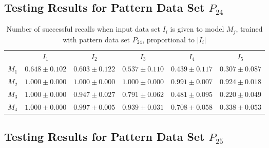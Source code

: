 \documentclass[anon]{CI}
\begin{document}
		\subsection{Testing Results for Pattern Data Set $P_{24}$}
		
		
		\begin{table}[H]
			\centering
			\def\arraystretch{1.5}
			\footnotesize
			\begin{tabular}{cccccc}
				
				& $I_{1}$  & $I_{2}$  & $I_{3}$  & $I_{4}$  & $I_{5}$ \\ \cline{2-6}
				$M_{1}$  & $0.648\pm0.102$  & $0.603\pm0.122$  & $0.537\pm0.110$  & $0.439\pm0.117$  & $0.307\pm0.087$ \\
				$M_{2}$  & $1.000\pm0.000$  & $1.000\pm0.000$  & $1.000\pm0.000$  & $0.991\pm0.007$  & $0.924\pm0.018$ \\
				$M_{3}$  & $1.000\pm0.000$  & $0.947\pm0.027$  & $0.791\pm0.062$  & $0.481\pm0.095$  & $0.220\pm0.049$ \\
				$M_{4}$  & $1.000\pm0.000$  & $0.997\pm0.005$  & $0.939\pm0.031$  & $0.708\pm0.058$  & $0.338\pm0.053$ \\
				
			\end{tabular}
			\caption{Number of successful recalls when input data set $I_i$ is given to model $M_j$, trained with pattern data set $P_{24}$, proportional to $\left|I_i\right|$}
		\end{table}
		
		\subsection{Testing Results for Pattern Data Set $P_{25}$}
		
		
\end{document}
